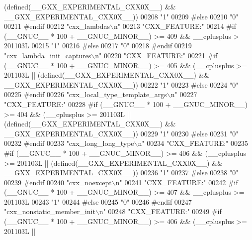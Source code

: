 \begin{DoxyCode}
{       (defined(\_\_GXX\_EXPERIMENTAL\_CXX0X\_\_) && \_\_GXX\_EXPERIMENTAL\_CXX0X\_\_))}
00208 \textcolor{stringliteral}{"1"}
00209 \textcolor{preprocessor}{#else}
00210 \textcolor{stringliteral}{"0"}
00211 \textcolor{preprocessor}{#endif}
00212 \textcolor{stringliteral}{"cxx\_lambdas\(\backslash\)n"}
00213 \textcolor{stringliteral}{"CXX\_FEATURE:"}
00214 \textcolor{preprocessor}{#if (\_\_GNUC\_\_ * 100 + \_\_GNUC\_MINOR\_\_) >= 409 && \_\_cplusplus > 201103L}
00215 \textcolor{stringliteral}{"1"}
00216 \textcolor{preprocessor}{#else}
00217 \textcolor{stringliteral}{"0"}
00218 \textcolor{preprocessor}{#endif}
00219 \textcolor{stringliteral}{"cxx\_lambda\_init\_captures\(\backslash\)n"}
00220 \textcolor{stringliteral}{"CXX\_FEATURE:"}
00221 \textcolor{preprocessor}{#if (\_\_GNUC\_\_ * 100 + \_\_GNUC\_MINOR\_\_) >= 405 && (\_\_cplusplus >= 201103L ||
       (defined(\_\_GXX\_EXPERIMENTAL\_CXX0X\_\_) && \_\_GXX\_EXPERIMENTAL\_CXX0X\_\_))}
00222 \textcolor{stringliteral}{"1"}
00223 \textcolor{preprocessor}{#else}
00224 \textcolor{stringliteral}{"0"}
00225 \textcolor{preprocessor}{#endif}
00226 \textcolor{stringliteral}{"cxx\_local\_type\_template\_args\(\backslash\)n"}
00227 \textcolor{stringliteral}{"CXX\_FEATURE:"}
00228 \textcolor{preprocessor}{#if (\_\_GNUC\_\_ * 100 + \_\_GNUC\_MINOR\_\_) >= 404 && (\_\_cplusplus >= 201103L ||
       (defined(\_\_GXX\_EXPERIMENTAL\_CXX0X\_\_) && \_\_GXX\_EXPERIMENTAL\_CXX0X\_\_))}
00229 \textcolor{stringliteral}{"1"}
00230 \textcolor{preprocessor}{#else}
00231 \textcolor{stringliteral}{"0"}
00232 \textcolor{preprocessor}{#endif}
00233 \textcolor{stringliteral}{"cxx\_long\_long\_type\(\backslash\)n"}
00234 \textcolor{stringliteral}{"CXX\_FEATURE:"}
00235 \textcolor{preprocessor}{#if (\_\_GNUC\_\_ * 100 + \_\_GNUC\_MINOR\_\_) >= 406 && (\_\_cplusplus >= 201103L ||
       (defined(\_\_GXX\_EXPERIMENTAL\_CXX0X\_\_) && \_\_GXX\_EXPERIMENTAL\_CXX0X\_\_))}
00236 \textcolor{stringliteral}{"1"}
00237 \textcolor{preprocessor}{#else}
00238 \textcolor{stringliteral}{"0"}
00239 \textcolor{preprocessor}{#endif}
00240 \textcolor{stringliteral}{"cxx\_noexcept\(\backslash\)n"}
00241 \textcolor{stringliteral}{"CXX\_FEATURE:"}
00242 \textcolor{preprocessor}{#if (\_\_GNUC\_\_ * 100 + \_\_GNUC\_MINOR\_\_) >= 407 && \_\_cplusplus >= 201103L}
00243 \textcolor{stringliteral}{"1"}
00244 \textcolor{preprocessor}{#else}
00245 \textcolor{stringliteral}{"0"}
00246 \textcolor{preprocessor}{#endif}
00247 \textcolor{stringliteral}{"cxx\_nonstatic\_member\_init\(\backslash\)n"}
00248 \textcolor{stringliteral}{"CXX\_FEATURE:"}
00249 \textcolor{preprocessor}{#if (\_\_GNUC\_\_ * 100 + \_\_GNUC\_MINOR\_\_) >= 406 && (\_\_cplusplus >= 201103L ||
}
\end{DoxyCode}
